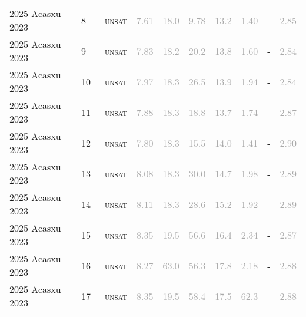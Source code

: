 \begin{center}
{\begin{longtable}{@{}llllllllll@{}}
2025 Acasxu 2023 & 8 & ~\textsc{unsat} & \textcolor{darkgray}{7.61} & \textcolor{darkgray}{18.0} & \textcolor{darkgray}{9.78} & \textcolor{darkgray}{13.2} & \textcolor{darkgray}{1.40} & - & \textcolor{darkgray}{2.85} \\
2025 Acasxu 2023 & 9 & ~\textsc{unsat} & \textcolor{darkgray}{7.83} & \textcolor{darkgray}{18.2} & \textcolor{darkgray}{20.2} & \textcolor{darkgray}{13.8} & \textcolor{darkgray}{1.60} & - & \textcolor{darkgray}{2.84} \\
2025 Acasxu 2023 & 10 & ~\textsc{unsat} & \textcolor{darkgray}{7.97} & \textcolor{darkgray}{18.3} & \textcolor{darkgray}{26.5} & \textcolor{darkgray}{13.9} & \textcolor{darkgray}{1.94} & - & \textcolor{darkgray}{2.84} \\
2025 Acasxu 2023 & 11 & ~\textsc{unsat} & \textcolor{darkgray}{7.88} & \textcolor{darkgray}{18.3} & \textcolor{darkgray}{18.8} & \textcolor{darkgray}{13.7} & \textcolor{darkgray}{1.74} & - & \textcolor{darkgray}{2.87} \\
2025 Acasxu 2023 & 12 & ~\textsc{unsat} & \textcolor{darkgray}{7.80} & \textcolor{darkgray}{18.3} & \textcolor{darkgray}{15.5} & \textcolor{darkgray}{14.0} & \textcolor{darkgray}{1.41} & - & \textcolor{darkgray}{2.90} \\
2025 Acasxu 2023 & 13 & ~\textsc{unsat} & \textcolor{darkgray}{8.08} & \textcolor{darkgray}{18.3} & \textcolor{darkgray}{30.0} & \textcolor{darkgray}{14.7} & \textcolor{darkgray}{1.98} & - & \textcolor{darkgray}{2.89} \\
2025 Acasxu 2023 & 14 & ~\textsc{unsat} & \textcolor{darkgray}{8.11} & \textcolor{darkgray}{18.3} & \textcolor{darkgray}{28.6} & \textcolor{darkgray}{15.2} & \textcolor{darkgray}{1.92} & - & \textcolor{darkgray}{2.89} \\
2025 Acasxu 2023 & 15 & ~\textsc{unsat} & \textcolor{darkgray}{8.35} & \textcolor{darkgray}{19.5} & \textcolor{darkgray}{56.6} & \textcolor{darkgray}{16.4} & \textcolor{darkgray}{2.34} & - & \textcolor{darkgray}{2.87} \\
2025 Acasxu 2023 & 16 & ~\textsc{unsat} & \textcolor{darkgray}{8.27} & \textcolor{darkgray}{63.0} & \textcolor{darkgray}{56.3} & \textcolor{darkgray}{17.8} & \textcolor{darkgray}{2.18} & - & \textcolor{darkgray}{2.88} \\
2025 Acasxu 2023 & 17 & ~\textsc{unsat} & \textcolor{darkgray}{8.35} & \textcolor{darkgray}{19.5} & \textcolor{darkgray}{58.4} & \textcolor{darkgray}{17.5} & \textcolor{darkgray}{62.3} & - & \textcolor{darkgray}{2.88} \\

\end{longtable}}
\end{center}
